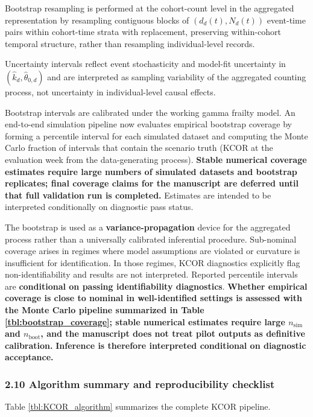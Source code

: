 \documentclass[
]{article}
\begin{document}
Bootstrap resampling is performed at the cohort-count level in the
aggregated representation by resampling contiguous blocks of
\((d_d(t), N_d(t))\) event-time pairs within cohort-time strata with
replacement, preserving within-cohort temporal structure, rather than
resampling individual-level records.

Uncertainty intervals reflect event stochasticity and model-fit
uncertainty in \((\hat{k}_d,\hat{\theta}_{0,d})\) and are interpreted as
sampling variability of the aggregated counting process, not uncertainty
in individual-level causal effects.

Bootstrap intervals are calibrated under the working gamma frailty
model. An end-to-end simulation pipeline now evaluates empirical
bootstrap coverage by forming a percentile interval for each simulated
dataset and computing the Monte Carlo fraction of intervals that contain
the scenario truth (KCOR at the evaluation week from the data-generating
process). \textbf{Stable numerical coverage estimates require large
numbers of simulated datasets and bootstrap replicates; final coverage
claims for the manuscript are deferred until that full validation run is
completed.} Estimates are intended to be interpreted conditionally on
diagnostic pass status.

The bootstrap is used as a \textbf{variance-propagation} device for the
aggregated process rather than a universally calibrated inferential
procedure. Sub-nominal coverage arises in regimes where model
assumptions are violated or curvature is insufficient for
identification. In those regimes, KCOR diagnostics explicitly flag
non-identifiability and results are not interpreted. Reported percentile
intervals are \textbf{conditional on passing identifiability
diagnostics}. \textbf{Whether empirical coverage is close to nominal in
well-identified settings is assessed with the Monte Carlo pipeline
summarized in Table \ref{tbl:bootstrap_coverage}; stable numerical
estimates require large \(n_{\mathrm{sim}}\) and \(n_{\mathrm{boot}}\),
and the manuscript does not treat pilot outputs as definitive
calibration.} \textbf{Inference is therefore interpreted conditional on
diagnostic acceptance.}

\subsubsection{2.10 Algorithm summary and reproducibility
checklist}\label{algorithm-summary-and-reproducibility-checklist}

Table \ref{tbl:KCOR_algorithm} summarizes the complete KCOR pipeline.
\end{document}
